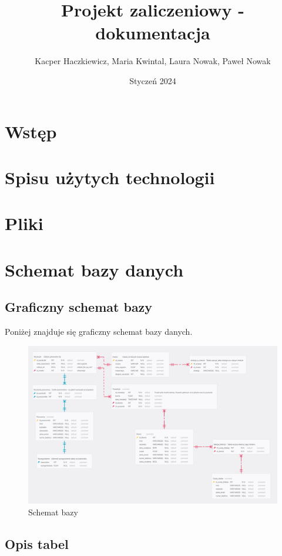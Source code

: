 \documentclass{article}
\author{Kacper Haczkiewicz, Maria Kwintal, Laura Nowak, Paweł Nowak}
\title{\textbf{Projekt zaliczeniowy - dokumentacja}}
\date{Styczeń 2024}
\begin{document}
	
	\maketitle
	
	\section{Wstęp}
	
	\section{Spisu użytych technologii}
	
	\section{Pliki}
	
	\section{Schemat bazy danych}
	
	\subsection{Graficzny schemat bazy}
	
	Poniżej znajduje się graficzny schemat bazy danych.
	
	\begin{figure}[H]
		\centering
		\includegraphics[scale=0.2]{diagram.PNG}
		\caption{Schemat bazy}
	\end{figure}
	
	\subsection{Opis tabel}
	
\end{document}
